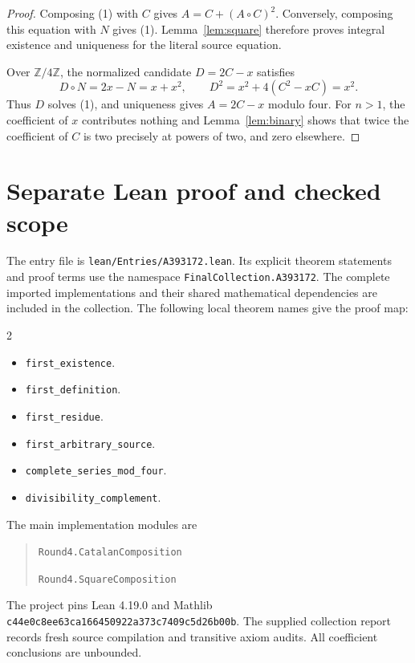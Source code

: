 \documentclass[11pt,a4paper]{article}
\theoremstyle{remark}
\newcommand{\Z}{\mathbb Z}
\begin{document}
\begin{proof}
Composing (1) with $C$ gives
$A=C+(A\circ C)^2$. Conversely, composing this equation with $N$
gives (1). Lemma~\ref{lem:square} therefore proves integral existence
and uniqueness for the literal source equation.

Over $\Z/4\Z$, the normalized candidate $D=2C-x$ satisfies
\[
 D\circ N=2x-N=x+x^2,
 \qquad D^2=x^2+4(C^2-xC)=x^2.
\]
Thus $D$ solves (1), and uniqueness gives $A=2C-x$ modulo four. For
$n>1$, the coefficient of $x$ contributes nothing and Lemma~\ref{lem:binary}
shows that twice the coefficient of $C$ is two precisely at powers of
two, and zero elsewhere.
\end{proof}


\section{Separate Lean proof and checked scope}

The entry file is \nolinkurl{lean/Entries/A393172.lean}. Its explicit
theorem statements and proof terms use the namespace
\nolinkurl{FinalCollection.A393172}. The complete imported implementations
and their shared mathematical dependencies are included in the collection.
The following local theorem names give the proof map:

\begin{multicols}{2}\raggedright\begin{itemize}\setlength{\itemsep}{2pt}\setlength{\parsep}{0pt}
\item \nolinkurl{first_existence}.
\item \nolinkurl{first_definition}.
\item \nolinkurl{first_residue}.
\item \nolinkurl{first_arbitrary_source}.
\item \nolinkurl{complete_series_mod_four}.
\item \nolinkurl{divisibility_complement}.
\end{itemize}\end{multicols}

The main implementation modules are
\begin{quote}\raggedright
\noindent\nolinkurl{Round4.CatalanComposition}\par
\noindent\nolinkurl{Round4.SquareComposition}\par
\end{quote}
The project pins Lean 4.19.0 and Mathlib
\nolinkurl{c44e0c8ee63ca166450922a373c7409c5d26b00b}.
The supplied collection report records fresh source compilation and
transitive axiom audits. All coefficient conclusions are unbounded.
\end{document}
